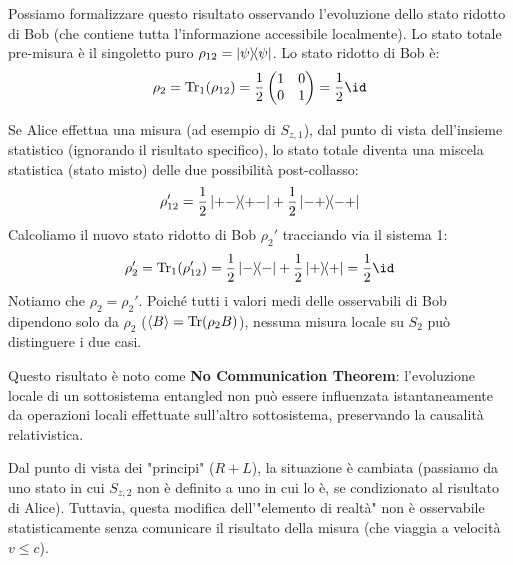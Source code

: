 Possiamo formalizzare questo risultato osservando l'evoluzione dello stato ridotto di Bob (che contiene tutta l'informazione accessibile localmente).
Lo stato totale pre-misura è il singoletto puro $\rho_{12} = \dyad{\psi}{\psi}$.
Lo stato ridotto di Bob è:
\[
    \rho_2 = \Tr_1(\rho_{12}) = \frac{1}{2} \begin{pmatrix} 1 & 0 \\ 0 & 1 \end{pmatrix} = \frac{1}{2} \id
\]

Se Alice effettua una misura (ad esempio di $S_{z,1}$), dal punto di vista dell'insieme statistico (ignorando il risultato specifico), lo stato totale diventa una miscela statistica (stato misto) delle due possibilità post-collasso:
\[
    \rho_{12}' = \frac{1}{2} \dyad{+-}{+-} + \frac{1}{2} \dyad{-+}{-+}
\]
Calcoliamo il nuovo stato ridotto di Bob $\rho_2'$ tracciando via il sistema 1:
\[
    \rho_2' = \Tr_1(\rho_{12}') = \frac{1}{2} \dyad{-}{-} + \frac{1}{2} \dyad{+}{+} = \frac{1}{2} \id
\]
Notiamo che $\rho_2 = \rho_2'$. Poiché tutti i valori medi delle osservabili di Bob dipendono solo da $\rho_2$ ($\ev{B} = \Tr(\rho_2 B)$), nessuna misura locale su $S_2$ può distinguere i due casi.

Questo risultato è noto come \textbf{No Communication Theorem}: l'evoluzione locale di un sottosistema entangled non può essere influenzata istantaneamente da operazioni locali effettuate sull'altro sottosistema, preservando la causalità relativistica.

\begin{remark}
    Dal punto di vista dei "principi" ($R+L$), la situazione è cambiata (passiamo da uno stato in cui $S_{z,2}$ non è definito a uno in cui lo è, se condizionato al risultato di Alice). Tuttavia, questa modifica dell'"elemento di realtà" non è osservabile statisticamente senza comunicare il risultato della misura (che viaggia a velocità $v \le c$).
\end{remark}


